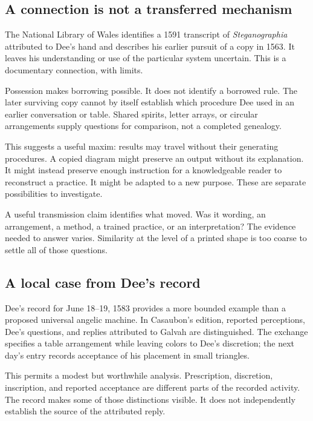 \documentclass[11pt]{article}
\begin{document}
\subsection{A connection is not a transferred mechanism}

The National Library of Wales identifies a 1591 transcript of
\emph{Steganographia} attributed to Dee's hand and describes his earlier
pursuit of a copy in 1563. It leaves his understanding or use of the
particular system uncertain.\cite{nlw}
This is a documentary connection, with limits.

Possession makes borrowing possible. It does not identify a borrowed rule.
The later surviving copy cannot by itself establish which procedure Dee
used in an earlier conversation or table. Shared spirits, letter arrays,
or circular arrangements supply questions for comparison, not a completed
genealogy.

This suggests a useful maxim: results may travel without their generating
procedures. A copied diagram might preserve an output without its explanation.
It might instead preserve enough instruction for a knowledgeable reader to
reconstruct a practice. It might be adapted to a new purpose. These are
separate possibilities to investigate.

A useful transmission claim identifies what moved. Was it wording, an
arrangement, a method, a trained practice, or an interpretation? The evidence
needed to answer varies. Similarity at the level of a printed shape is
too coarse to settle all of those questions.

\subsection{A local case from Dee's record}

Dee's record for June 18--19, 1583 provides a more bounded example than a
proposed universal angelic machine. In Casaubon's edition, reported perceptions,
Dee's questions, and replies attributed to Galvah are distinguished.
The exchange specifies a table arrangement while leaving colors to Dee's
discretion; the next day's entry records acceptance of his placement in
small triangles.\cite{deeLayout}

This permits a modest but worthwhile analysis. Prescription, discretion,
inscription, and reported acceptance are different parts of the recorded
activity. The record makes some of those distinctions visible. It does not
independently establish the source of the attributed reply.
\end{document}
